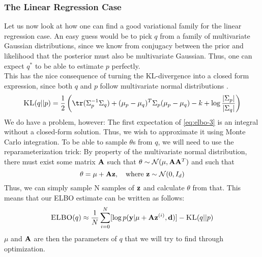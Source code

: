 \subsubsection{The Linear Regression Case}
Let us now look at how one can find a good variational family for the linear regression case.
An easy guess would be to pick $q$ from a family of multivariate Gaussian distributions, since we know from conjugacy between the prior and likelihood that the posterior must also be multivariate Gaussian.
Thus, one can expect $q^*$ to be able to estimate $p$ perfectly.\\
This has the nice consequence of turning the KL-divergence into a closed form expression, since both $q$ and $p$ follow multivariate normal distributions \cite{kld-gaussian}.\\
\begin{equation}\textsc{KL}(q || p) = \frac{1}{2}\left(\tr (\Sigma_p^{-1}\Sigma_q) + (\mu_p -\mu_q)^T\Sigma_p(\mu_p - \mu_q) - k + \log \frac{|\Sigma_p|}{|\Sigma_q|}\right)\end{equation}
We do have a problem, however: The first expectation of \eqref{eq:elbo-3} is an integral without a closed-form solution.
Thus, we wish to approximate it using Monte Carlo integration. 
To be able to sample $\theta$s from $q$, we will need to use the reparameterization trick:
By property of the multivariate normal distribution, there must exist some matrix $\mathbf{A}$ such that $\theta \sim \mathcal{N}(\mu, \mathbf{A} \mathbf{A}^T)$ \cite{krause22}
and such that
\begin{equation}\theta = \mu + \B{A}\B{z}, \quad \textrm{where}\ \B{z}\sim \mathcal{N}(0,I_d)\end{equation}
Thus, we can simply sample N samples of $\mathbf{z}$ and calculate $\theta$ from that. 
This means that our ELBO estimate can be written as follows:
\begin{equation}\textsc{ELBO}(q) \approx \frac{1}{N}\sum_{i=0}^N [\log p(\mathbf{y} | \mu + \mathbf{A}\mathbf{z}^{(i)}, \mathbf{d})] - \textsc{KL}(q || p)\label{eq:final-elbo}\end{equation}
$\mu$ and $\mathbf{A}$ are then the parameters of $q$ that we will try to find through optimization.
